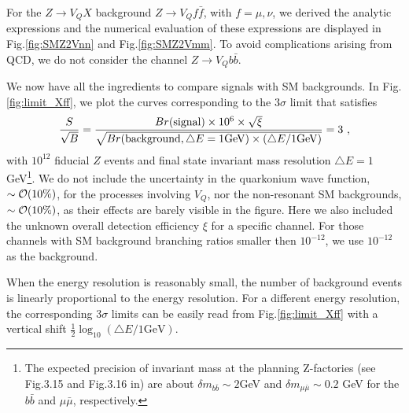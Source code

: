 \documentclass[11pt]{article}
\begin{document}
 For the $Z\to V_Q X$ background $ Z\to V_Q f\bar{f}$, with $f=\mu,\nu$, we derived  the analytic expressions and the numerical evaluation of these expressions are displayed in Fig.\ref{fig:SMZ2Vnn} and Fig.\ref{fig:SMZ2Vmm}.  To avoid complications arising from QCD, we do not consider the channel $Z\to V_Q b\bar{b}$.

We now have all the ingredients to compare signals with SM backgrounds.
In Fig.\ref{fig:limit_Xff}, we plot the curves corresponding to the $3\sigma$ limit that satisfies
\begin{equation}
\frac{S}{\sqrt{B}}= {Br(\mbox{signal}) \times 10^6 \times  \sqrt{\xi}\over \sqrt{Br(\mbox{background},\triangle E=1\mbox{GeV})\times(\triangle E /1\mbox{GeV} )}}=3\ ,
\end{equation}
with $10^{12}$ fiducial $Z$ events and  final state invariant mass resolution $\triangle E=1$ GeV\footnote{The expected precision of invariant mass  at the planning Z-factories (see Fig.3.15 and Fig.3.16 in\cite{CEPC-SPPCStudyGroup:2015csa}) are  about $\delta m_{b\bar{b}}\sim 2$GeV and $\delta m_{\mu\bar{\mu}}\sim 0.2$ GeV for the $b\bar{b}$ and $\mu\bar{\mu}$, respectively.  }.
  We do not include the uncertainty in the quarkonium wave function, $\sim {\cal O}(10\%)$, for the processes involving $V_Q$, nor the
non-resonant SM backgrounds, $\sim {\cal O}(10\%)$, as their effects are barely visible in the figure.
Here we also included the unknown overall detection efficiency $\xi$ for a specific channel. 
For those channels with SM background branching ratios smaller then $10^{-12}$, we use $10^{-12}$ as the background.

When the energy resolution is reasonably small, the number of background events is linearly proportional to the energy resolution.
For a different energy resolution,  the corresponding $3\sigma$ limits can be easily  read from  Fig.\ref{fig:limit_Xff} with a vertical shift $\frac{1}{2} \log_{10}(\triangle E/ 1\mbox{GeV})$.
\end{document}
